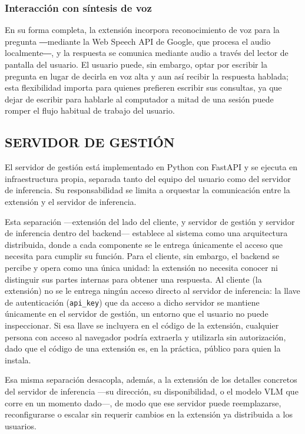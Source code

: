 \subsubsection{Interacción con síntesis de voz}

En su forma completa, la extensión incorpora reconocimiento de voz para la pregunta ―mediante la Web Speech API de Google, que procesa el audio localmente―, y la respuesta se comunica mediante audio a través del lector de pantalla del usuario. El usuario puede, sin embargo, optar por escribir la pregunta en lugar de decirla en voz alta y aun así recibir la respuesta hablada; esta flexibilidad importa para quienes prefieren escribir sus consultas, ya que dejar de escribir para hablarle al computador a mitad de una sesión puede romper el flujo habitual de trabajo del usuario.

\subsection{SERVIDOR DE GESTIÓN}

El servidor de gestión está implementado en Python con FastAPI y se ejecuta en infraestructura propia, separada tanto del equipo del usuario como del servidor de inferencia. Su responsabilidad se limita a orquestar la comunicación entre la extensión y el servidor de inferencia.

Esta separación —extensión del lado del cliente, y servidor de gestión y servidor de inferencia dentro del backend— establece al sistema como una arquitectura distribuida, donde a cada componente se le entrega únicamente el acceso que necesita para cumplir su función. Para el cliente, sin embargo, el backend se percibe y opera como una única unidad: la extensión no necesita conocer ni distinguir sus partes internas para obtener una respuesta. Al cliente (la extensión) no se le entrega ningún acceso directo al servidor de inferencia: la llave de autenticación (\texttt{api\_key}) que da acceso a dicho servidor se mantiene únicamente en el servidor de gestión, un entorno que el usuario no puede inspeccionar. Si esa llave se incluyera en el código de la extensión, cualquier persona con acceso al navegador podría extraerla y utilizarla sin autorización, dado que el código de una extensión es, en la práctica, público para quien la instala.

Esa misma separación desacopla, además, a la extensión de los detalles concretos del servidor de inferencia —su dirección, su disponibilidad, o el modelo VLM que corre en un momento dado—, de modo que ese servidor puede reemplazarse, reconfigurarse o escalar sin requerir cambios en la extensión ya distribuida a los usuarios.

